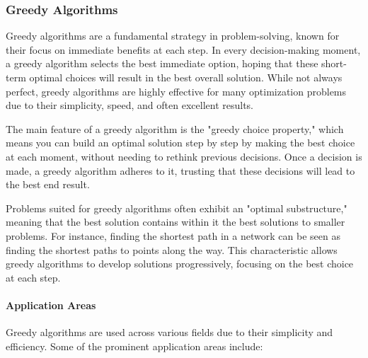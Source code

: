 \documentclass[
]{article}
\begin{document}
  \subsubsection{Greedy Algorithms}

Greedy algorithms are a fundamental strategy in problem-solving, known for their focus on immediate benefits at each step. In every decision-making moment, a greedy algorithm selects the best immediate option, hoping that these short-term optimal choices will result in the best overall solution. While not always perfect, greedy algorithms are highly effective for many optimization problems due to their simplicity, speed, and often excellent results.

The main feature of a greedy algorithm is the "greedy choice property," which means you can build an optimal solution step by step by making the best choice at each moment, without needing to rethink previous decisions. Once a decision is made, a greedy algorithm adheres to it, trusting that these decisions will lead to the best end result.

Problems suited for greedy algorithms often exhibit an "optimal substructure," meaning that the best solution contains within it the best solutions to smaller problems. For instance, finding the shortest path in a network can be seen as finding the shortest paths to points along the way. This characteristic allows greedy algorithms to develop solutions progressively, focusing on the best choice at each step.

\paragraph{Application Areas}

Greedy algorithms are used across various fields due to their simplicity and efficiency. Some of the prominent application areas include:
\end{document}
